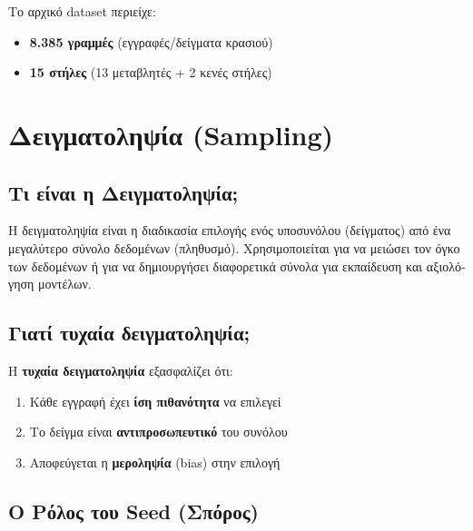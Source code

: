 \documentclass[12pt,a4paper]{article}
\begin{document}
\textgreek{Το αρχικό dataset περιείχε:}
\begin{itemize}
    \item \textbf{8.385 \textgreek{γραμμές}} \textgreek{(εγγραφές/δείγματα κρασιού)}
    \item \textbf{15 \textgreek{στήλες}} \textgreek{(13 μεταβλητές + 2 κενές στήλες)}
\end{itemize}

\section{\textgreek{Δειγματοληψία (Sampling)}}

\subsection{\textgreek{Τι είναι η Δειγματοληψία;}}

\begin{infobox}
\textgreek{Η δειγματοληψία είναι η διαδικασία επιλογής ενός υποσυνόλου (δείγματος) από ένα μεγαλύτερο σύνολο δεδομένων (πληθυσμό). Χρησιμοποιείται για να μειώσει τον όγκο των δεδομένων ή για να δημιουργήσει διαφορετικά σύνολα για εκπαίδευση και αξιολόγηση μοντέλων.}
\end{infobox}

\subsection{\textgreek{Γιατί τυχαία δειγματοληψία;}}

\textgreek{Η} \textbf{\textgreek{τυχαία δειγματοληψία}} \textgreek{εξασφαλίζει ότι:}
\begin{enumerate}
    \item \textgreek{Κάθε εγγραφή έχει} \textbf{\textgreek{ίση πιθανότητα}} \textgreek{να επιλεγεί}
    \item \textgreek{Το δείγμα είναι} \textbf{\textgreek{αντιπροσωπευτικό}} \textgreek{του συνόλου}
    \item \textgreek{Αποφεύγεται η} \textbf{\textgreek{μεροληψία}} (bias) \textgreek{στην επιλογή}
\end{enumerate}

\subsection{\textgreek{Ο Ρόλος του Seed (Σπόρος)}}
\end{document}
